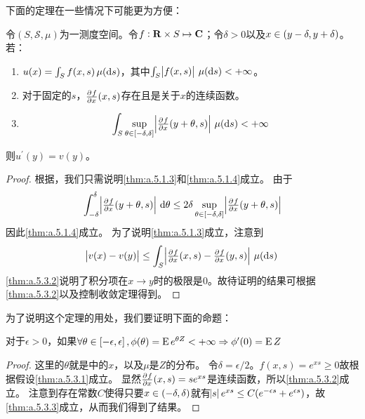 \documentclass[main.tex]{subfiles}
\begin{document}
下面的定理在一些情况下可能更为方便：
\begin{theorem} \label{thm:a.5.3}
	令\((S,\mathcal{S}, \mu)\)为一测度空间。令\(f: \mathbf{R}\times S \mapsto\mathbf{C}\)；令\(\delta>0\)以及\(x\in \intoo{y-\delta, y+\delta}\)。若：
	\begin{enumerate}
		\item \label{thm:a.5.3.1} \(u(x) = \int_S f(x, s)\,\mu(\dif s)\)，其中\(\int_S \envert{f(x, s)}\,\mu(\dif s) < +\infty\)。
		\item \label{thm:a.5.3.2} 对于固定的\(s\)，\(\pd{f}{x}(x, s)\)存在且是关于\(x\)的连续函数。
		\item \label{thm:a.5.3.3} \[\int_S \sup_{\theta \in \intcc{-\delta, \delta}}\envert{\pd{f}{x}(y+\theta, s)}\,\mu(\dif s) < +\infty\]
	\end{enumerate}
	则\(u^\prime(y)=v(y)\)。
\end{theorem}
\begin{proof}
	根据，我们只需说明\ref{thm:a.5.1.3}和\ref{thm:a.5.1.4}成立。
	由于
	\[\int_{-\delta}^\delta \envert{\pd{f}{x}(y+\theta, s)}\,\dif \theta \leq 2\delta\sup_{\theta \in \intcc{-\delta, \delta}}\envert{\pd{f}{x}(y+\theta, s)}\]
	因此\ref{thm:a.5.1.4}成立。
	为了说明\ref{thm:a.5.1.3}成立，注意到
	\[\envert{v(x) - v(y)} \leq \int_S \envert{\pd{f}{x}(x, s) - \pd{f}{x}(y,s)}\,\mu(\dif s)\]
	\ref{thm:a.5.3.2}说明了积分项在\(x\rightarrow y\)时的极限是\(0\)。故待证明的结果可根据\ref{thm:a.5.3.2}以及控制收敛定理得到。
\end{proof}

为了说明这个定理的用处，我们要证明下面的命题：
\begin{example}
	对于\(\epsilon > 0\)，如果\(\forall \theta \in \intcc{-\epsilon, \epsilon},\phi(\theta) = \E e^{\theta Z} < +\infty \Rightarrow \phi^\prime(0) = \E Z\)
\end{example}
\begin{proof}
	这里的\(\theta\)就是中的\(x\)，以及\(\mu\)是\(Z\)的分布。
	令\(\delta = \epsilon/2\)。\(f(x,s) = e^{xs} \geq 0\)故根据假设\ref{thm:a.5.3.1}成立。
	显然\(\pd{f}{x}(x, s) = se^{xs}\)是连续函数，所以\ref{thm:a.5.3.2}成立。
	注意到存在常数\(C\)使得只要\(x \in \intoo{-\delta, \delta}\)就有\(\envert{s}e^{xs}\leq C(e^{-\epsilon s}+e^{\epsilon s})\)，故\ref{thm:a.5.3.3}成立，从而我们得到了结果。
\end{proof}
\end{document}
